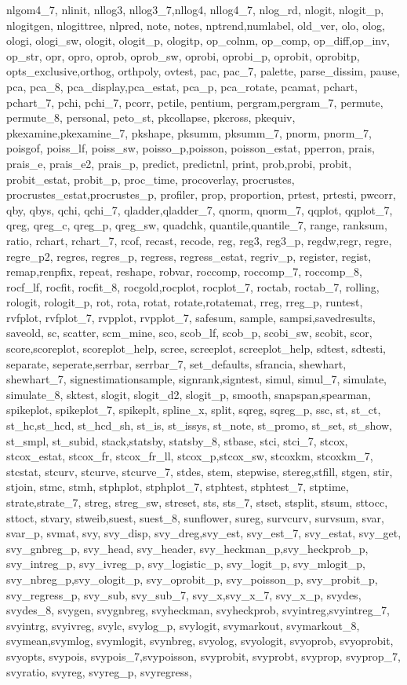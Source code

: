 {{nlgom4_7, nlinit, nllog3, nllog3_7,nllog4, nllog4_7, nlog_rd, nlogit, nlogit_p, nlogitgen, nlogittree, nlpred, note, notes, nptrend,numlabel, old_ver, olo, olog, ologi, ologi_sw, ologit, ologit_p, ologitp, op_colnm, op_comp, op_diff,op_inv, op_str, opr, opro, oprob, oprob_sw, oprobi, oprobi_p, oprobit, oprobitp, opts_exclusive,orthog, orthpoly, ovtest, pac, pac_7, palette, parse_dissim, pause, pca, pca_8, pca_display,pca_estat, pca_p, pca_rotate, pcamat, pchart, pchart_7, pchi, pchi_7, pcorr, pctile, pentium, pergram,pergram_7, permute, permute_8, personal, peto_st, pkcollapse, pkcross, pkequiv, pkexamine,pkexamine_7, pkshape, pksumm, pksumm_7, pnorm, pnorm_7, poisgof, poiss_lf, poiss_sw, poisso_p,poisson, poisson_estat, pperron, prais, prais_e, prais_e2, prais_p, predict, predictnl, print, prob,probi, probit, probit_estat, probit_p, proc_time, procoverlay, procrustes, procrustes_estat,procrustes_p, profiler, prop, proportion, prtest, prtesti, pwcorr, qby, qbys, qchi, qchi_7, qladder,qladder_7, qnorm, qnorm_7, qqplot, qqplot_7, qreg, qreg_c, qreg_p, qreg_sw, quadchk, quantile,quantile_7, range, ranksum, ratio, rchart, rchart_7, rcof, recast, recode, reg, reg3, reg3_p, regdw,regr, regre, regre_p2, regres, regres_p, regress, regress_estat, regriv_p, register, regist, remap,renpfix, repeat, reshape, robvar, roccomp, roccomp_7, roccomp_8, rocf_lf, rocfit, rocfit_8, rocgold,rocplot, rocplot_7, roctab, roctab_7, rolling, rologit, rologit_p, rot, rota, rotat, rotate,rotatemat, rreg, rreg_p, runtest, rvfplot, rvfplot_7, rvpplot, rvpplot_7, safesum, sample, sampsi,savedresults, saveold, sc, scatter, scm_mine, sco, scob_lf, scob_p, scobi_sw, scobit, scor, score,scoreplot, scoreplot_help, scree, screeplot, screeplot_help, sdtest, sdtesti, separate, seperate,serrbar, serrbar_7, set_defaults, sfrancia, shewhart, shewhart_7, signestimationsample, signrank,signtest, simul, simul_7, simulate, simulate_8, sktest, slogit, slogit_d2, slogit_p, smooth, snapspan,spearman, spikeplot, spikeplot_7, spikeplt, spline_x, split, sqreg, sqreg_p, ssc, st, st_ct, st_hc,st_hcd, st_hcd_sh, st_is, st_issys, st_note, st_promo, st_set, st_show, st_smpl, st_subid, stack,statsby, statsby_8, stbase, stci, stci_7, stcox, stcox_estat, stcox_fr, stcox_fr_ll, stcox_p,stcox_sw, stcoxkm, stcoxkm_7, stcstat, stcurv, stcurve, stcurve_7, stdes, stem, stepwise, stereg,stfill, stgen, stir, stjoin, stmc, stmh, stphplot, stphplot_7, stphtest, stphtest_7, stptime, strate,strate_7, streg, streg_sw, streset, sts, sts_7, stset, stsplit, stsum, sttocc, sttoct, stvary, stweib,suest, suest_8, sunflower, sureg, survcurv, survsum, svar, svar_p, svmat, svy, svy_disp, svy_dreg,svy_est, svy_est_7, svy_estat, svy_get, svy_gnbreg_p, svy_head, svy_header, svy_heckman_p,svy_heckprob_p, svy_intreg_p, svy_ivreg_p, svy_logistic_p, svy_logit_p, svy_mlogit_p, svy_nbreg_p,svy_ologit_p, svy_oprobit_p, svy_poisson_p, svy_probit_p, svy_regress_p, svy_sub, svy_sub_7, svy_x,svy_x_7, svy_x_p, svydes, svydes_8, svygen, svygnbreg, svyheckman, svyheckprob, svyintreg,svyintreg_7, svyintrg, svyivreg, svylc, svylog_p, svylogit, svymarkout, svymarkout_8, svymean,svymlog, svymlogit, svynbreg, svyolog, svyologit, svyoprob, svyoprobit, svyopts, svypois, svypois_7,svypoisson, svyprobit, svyprobt, svyprop, svyprop_7, svyratio, svyreg, svyreg_p, svyregress, }}
